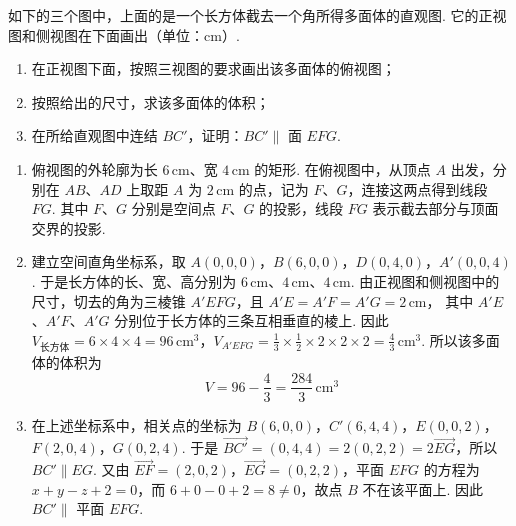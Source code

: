 \begin{problem}
如下的三个图中，上面的是一个长方体截去一个角所得多面体的直观图. 它的正视图和侧视图在下面画出（单位：\(\mathrm{cm}\)）.

\begin{enumerate}
\item 在正视图下面，按照三视图的要求画出该多面体的俯视图；
\item 按照给出的尺寸，求该多面体的体积；
\item 在所给直观图中连结 \(BC'\)，证明：\(BC' \parallel\) 面 \(EFG\).
\end{enumerate}

\FloatBarrier

\begin{solution}
\begin{enumerate}
\item 俯视图的外轮廓为长 \(6\,\mathrm{cm}\)、宽 \(4\,\mathrm{cm}\) 的矩形. 在俯视图中，从顶点 \(A\) 出发，分别在 \(AB\)、\(AD\) 上取距 \(A\) 为 \(2\,\mathrm{cm}\) 的点，记为 \(F\)、\(G\)，连接这两点得到线段 \(FG\). 其中 \(F\)、\(G\) 分别是空间点 \(F\)、\(G\) 的投影，线段 \(FG\) 表示截去部分与顶面交界的投影.

\item 建立空间直角坐标系，取 \(A(0,0,0)\)，\(B(6,0,0)\)，\(D(0,4,0)\)，\(A'(0,0,4)\).
于是长方体的长、宽、高分别为 \(6\,\mathrm{cm}\)、\(4\,\mathrm{cm}\)、\(4\,\mathrm{cm}\). 由正视图和侧视图中的尺寸，切去的角为三棱锥 \(A'EFG\)，且
\(A'E=A'F=A'G=2\,\mathrm{cm}\)，
其中 \(A'E\)、\(A'F\)、\(A'G\) 分别位于长方体的三条互相垂直的棱上. 因此
\(V_{\text{长方体}}=6\times4\times4=96\,\mathrm{cm}^{3}\)，\(V_{A'EFG}=\frac{1}{3}\times\frac{1}{2}\times2\times2\times2=\frac{4}{3}\,\mathrm{cm}^{3}\).
所以该多面体的体积为
\[
V=96-\frac{4}{3}=\frac{284}{3}\,\mathrm{cm}^{3}
\]

\item 在上述坐标系中，相关点的坐标为 \(B(6,0,0)\)，\(C'(6,4,4)\)，\(E(0,0,2)\)，\(F(2,0,4)\)，\(G(0,2,4)\). 于是 \(\overrightarrow{BC'}=(0,4,4)=2(0,2,2)=2\overrightarrow{EG}\)，所以 \(BC'\parallel EG\). 又由 \(\overrightarrow{EF}=(2,0,2)\)，\(\overrightarrow{EG}=(0,2,2)\)，平面 \(EFG\) 的方程为 \(x+y-z+2=0\)，而 \(6+0-0+2=8\ne0\)，故点 \(B\) 不在该平面上. 因此 \(BC'\parallel\) 平面 \(EFG\).
\end{enumerate}
\end{solution}
\end{problem}

